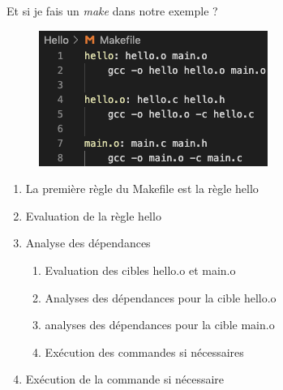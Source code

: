 \documentclass[10pt,xcolor=dvipsnames]{beamer}
\newcommand{\green}[1]{\textcolor{darkspringgreen}{#1}}
\begin{document}
\begin{frame}{Et si je fais un \textit{make} dans notre exemple ?}
    
    \begin{minipage}[t]{0.4\textwidth}
    \begin{figure}
        \centering
        \includegraphics[scale=0.4]{figures/makefile_hello.png}
        \label{fig:my_label}
    \end{figure}
\end{minipage}
\begin{minipage}[t]{0.55\textwidth}
\begin{enumerate}[<+->]
\item La première règle du Makefile est la règle \green{hello}
\item Evaluation de la règle \green{hello}
\item Analyse des dépendances
\begin{enumerate}
    \item Evaluation des cibles \green{hello.o} et \green{main.o}
    \item Analyses des dépendances pour la cible \green{hello.o}
    \item analyses des dépendances pour la cible \green{main.o}
    \item Exécution des commandes si nécessaires
\end{enumerate}
\item Exécution de la commande si nécessaire
\end{enumerate}
\end{minipage}
    
\end{frame}
\end{document}
